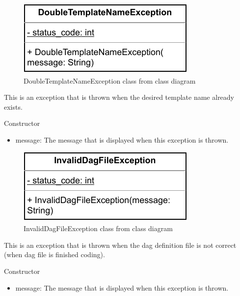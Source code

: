\begin{figure}[H]
    \centerline{\includegraphics[scale=1]{res/Klassen/DoubleTemplateNameException.pdf}}
    \caption{DoubleTemplateNameException class from class diagram}
\end{figure}

This is an exception that is thrown when the desired template name already exists.
\begin{methodenv}{Constructor}

\begin{itemize}
    \item{message:}
    The message that is displayed when this exception is thrown.
\end{itemize}
\end{methodenv}



\begin{figure}[H]
    \centerline{\includegraphics[scale=1]{res/Klassen/InvalidDagFileException.pdf}}
    \caption{InvalidDagFileException class from class diagram}
\end{figure}

This is an exception that is thrown when the dag definition file is not correct (when dag file is finished coding).
\begin{methodenv}{Constructor}

\begin{itemize}
    \item{message:}
    The message that is displayed when this exception is thrown.
\end{itemize}
\end{methodenv}


